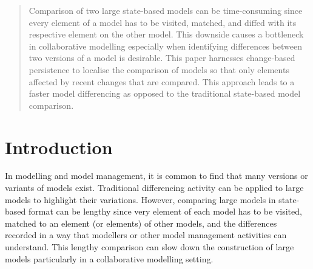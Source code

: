 \documentclass{llncs}
\begin{document}
\begin{abstract}
Comparison of two large state-based models can be time-consuming since every element of a model has to be visited, matched, and diffed with its respective element on the other model. This downside causes a bottleneck in collaborative modelling especially when identifying differences between two versions of a model is desirable. This paper harnesses change-based persistence to localise the comparison of models so that only elements affected by recent changes that are compared. This approach leads to a faster model differencing as opposed to the traditional state-based model comparison. 
\end{abstract}

\vspace{-10pt}
\section{Introduction}
\label{sec:introduction}

\vspace{-5pt}


In modelling and model management, it is common to find that many versions or variants of models exist. 
Traditional differencing activity can be applied to large models to highlight their variations. However,
comparing large models in state-based format can be lengthy since very element of each model has to be visited, matched to an element (or elements) of other models, and the differences recorded in a way that modellers or other model management activities can understand.
This lengthy comparison can slow down the construction of large models particularly in a collaborative modelling setting. 
\end{document}

